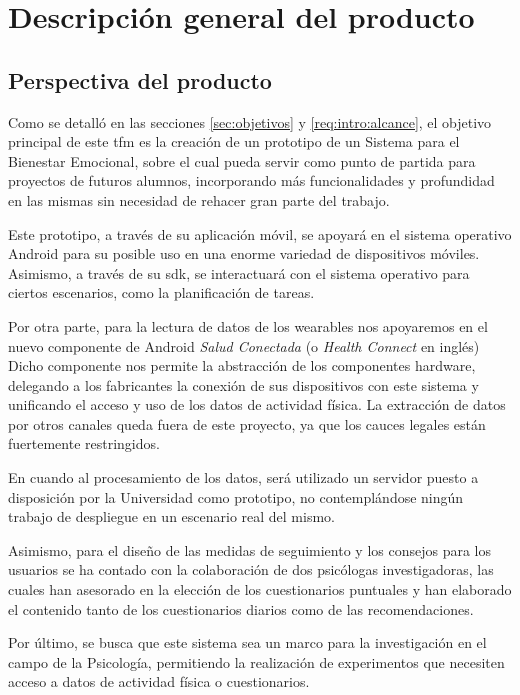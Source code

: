 \section{Descripción general del producto}
    \label{req:descripcion}

    \subsection{Perspectiva del producto}
        \label{req:descripcion:perspectiva}

        Como se detalló en las secciones \ref{sec:objetivos} y 
        \ref{req:intro:alcance}, el objetivo principal de este \gls{tfm} es la creación de un prototipo de un Sistema para el Bienestar Emocional, sobre el cual pueda servir como punto de partida para proyectos de futuros alumnos, incorporando más funcionalidades y profundidad en las mismas sin necesidad de rehacer gran parte del trabajo. 

        Este prototipo, a través de su aplicación móvil, se apoyará en el sistema operativo Android para su posible uso en una enorme variedad de dispositivos móviles. Asimismo, a través de su \gls{sdk}, se interactuará con el sistema operativo para ciertos escenarios, como la planificación de tareas.

        Por otra parte, para la lectura de datos de los \glspl{wearable} nos apoyaremos en el nuevo componente de Android \textit{Salud Conectada} (o \textit{Health Connect} en inglés) Dicho componente nos permite la abstracción de los componentes hardware, delegando a los fabricantes la conexión de sus dispositivos con este sistema y unificando el acceso y uso de los datos de actividad física. La extracción de datos por otros canales queda fuera de este proyecto, ya que los cauces legales están fuertemente restringidos. 

        En cuando al procesamiento de los datos, será utilizado un servidor puesto a disposición por la Universidad como prototipo, no contemplándose ningún trabajo de despliegue en un escenario real del mismo.

        Asimismo, para el diseño de las medidas de seguimiento y los consejos para los usuarios se ha contado con la colaboración de dos psicólogas investigadoras, las cuales han asesorado en la elección de los cuestionarios puntuales y han elaborado el contenido tanto de los cuestionarios diarios como de las recomendaciones. 
        
        Por último, se busca que este sistema sea un marco para la investigación en el campo de la Psicología, permitiendo la realización de experimentos que necesiten acceso a datos de actividad física o cuestionarios.


